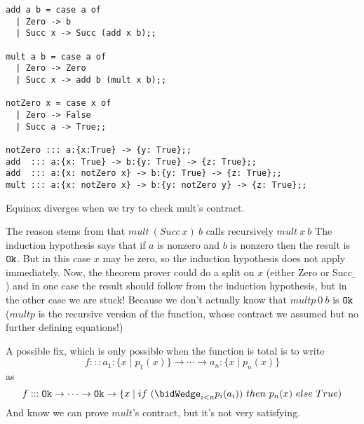 \documentclass{article}
\begin{document}
\begin{verbatim}
add a b = case a of
  | Zero -> b
  | Succ x -> Succ (add x b);;

mult a b = case a of
  | Zero -> Zero
  | Succ x -> add b (mult x b);;

notZero x = case x of
  | Zero -> False
  | Succ a -> True;;

notZero ::: a:{x:True} -> {y: True};;
add  ::: a:{x: True} -> b:{y: True} -> {z: True};;
add  ::: a:{x: notZero x} -> b:{y: True} -> {z: True};;
mult ::: a:{x: notZero x} -> b:{y: notZero y} -> {z: True};;
\end{verbatim}

Equinox diverges when we try to check mult's contract.

The reason stems from that $mult~(Succ~x)~b$ calls recursively
$mult~x~b$ The induction hypothesis says that if $a$ is nonzero and
$b$ is nonzero then the result is $\texttt{Ok}$. But in this case $x$ may be
zero, so the induction hypothesis does not apply immediately. Now, the
theorem prover could do a split on $x$ (either Zero or Succ$\_$) and
in one case the result should follow from the induction hypothesis,
but in the other case we are stuck! Because we don't actually know
that $multp~0~b$ is $\texttt{Ok}$ ($multp$ is the recursive version of the
function, whose contract we assumed but no further defining
equations!)

A possible fix, which is only possible when the function is total is
to write $$f ::: a_1:\{x \mid p_1(x) \} \to \cdots \to a_n:\{x \mid
p_n(x) \}$$ as $$f ::: \ok \to \cdots \to \ok \to \{x \mid
if~(\bidWedge_{i < n} p_i(a_i))~then~p_n(x)~else~True)$$ And know we
can prove $mult$'s contract, but it's not very satisfying.
\end{document}
